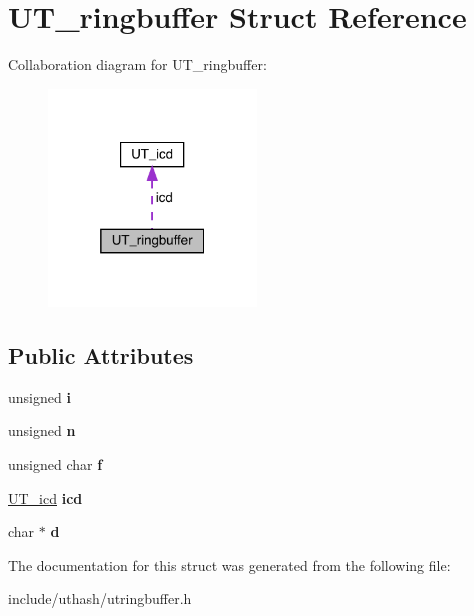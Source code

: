 \hypertarget{struct_u_t__ringbuffer}{}\section{U\+T\+\_\+ringbuffer Struct Reference}
\label{struct_u_t__ringbuffer}


Collaboration diagram for U\+T\+\_\+ringbuffer\+:\nopagebreak
\begin{figure}[H]
\begin{center}
\leavevmode
\includegraphics[width=157pt]{struct_u_t__ringbuffer__coll__graph}
\end{center}
\end{figure}
\subsection*{Public Attributes}
\begin{DoxyCompactItemize}
\item 
\mbox{\label{struct_u_t__ringbuffer_a6708be920ab5135cc4b06694a17dd3bc}} 
unsigned {\bfseries i}
\item 
\mbox{\label{struct_u_t__ringbuffer_a96e99a1747c8a882ba10bebd038d9503}} 
unsigned {\bfseries n}
\item 
\mbox{\label{struct_u_t__ringbuffer_af1c3dd3268f90808f9a4b43fdcf2378d}} 
unsigned char {\bfseries f}
\item 
\mbox{\label{struct_u_t__ringbuffer_a58d090271a003e683d40c6e05e1906f6}} 
\mbox{\hyperlink{struct_u_t__icd}{U\+T\+\_\+icd}} {\bfseries icd}
\item 
\mbox{\label{struct_u_t__ringbuffer_a28975314fd3873ed6ca86e4658f6c759}} 
char $\ast$ {\bfseries d}
\end{DoxyCompactItemize}


The documentation for this struct was generated from the following file\+:\begin{DoxyCompactItemize}
\item 
include/uthash/utringbuffer.\+h\end{DoxyCompactItemize}

